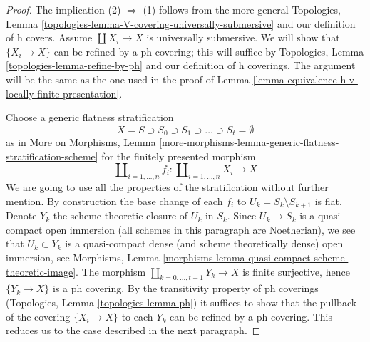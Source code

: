 \begin{proof}
The implication (2) $\Rightarrow$ (1) follows from the more general
Topologies, Lemma \ref{topologies-lemma-V-covering-universally-submersive}
and our definition of h covers. Assume $\coprod X_i \to X$
is universally submersive. We will show that $\{X_i \to X\}$
can be refined by a ph covering; this will suffice by
Topologies, Lemma \ref{topologies-lemma-refine-by-ph} and
our definition of h coverings.
The argument will be the same as the one used in the proof of
Lemma \ref{lemma-equivalence-h-v-locally-finite-presentation}.

\medskip\noindent
Choose a generic flatness stratification
$$
X = S \supset S_0 \supset S_1 \supset \ldots \supset S_t = \emptyset
$$
as in More on Morphisms, Lemma
\ref{more-morphisms-lemma-generic-flatness-stratification-scheme}
for the finitely presented morphism
$$
\coprod\nolimits_{i = 1, \ldots, n} f_i :
\coprod\nolimits_{i = 1, \ldots, n} X_i
\longrightarrow
X
$$
We are going to use all the properties of the stratification
without further mention. By construction the base change of each
$f_i$ to $U_k = S_k \setminus S_{k + 1}$ is flat.
Denote $Y_k$ the scheme theoretic closure of $U_k$ in $S_k$. Since
$U_k \to S_k$ is a quasi-compact open immersion (all schemes in
this paragraph are Noetherian),
we see that $U_k \subset Y_k$ is a quasi-compact dense
(and scheme theoretically dense) open immersion, see
Morphisms, Lemma \ref{morphisms-lemma-quasi-compact-scheme-theoretic-image}.
The morphism $\coprod_{k = 0, \ldots, t - 1} Y_k \to X$
is finite surjective, hence $\{Y_k \to X\}$ is a ph covering.
By the transitivity property of ph coverings
(Topologies, Lemma \ref{topologies-lemma-ph})
it suffices to show that the pullback of
the covering $\{X_i \to X\}$ to each $Y_k$ can be refined by a
ph covering. This reduces us to the case described in the
next paragraph.


\end{proof}
